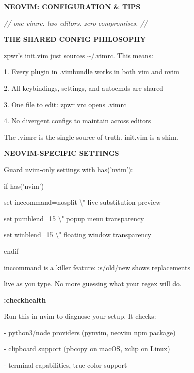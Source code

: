 \documentclass[11pt,a4paper,twoside]{book}
\begin{document}
\vspace{10pt}
{\large\bfseries\color{neoncyan} NEOVIM: CONFIGURATION \& TIPS}\vspace{6pt}

{\small\itshape\color{dimtext} // one vimrc. two editors. zero compromises. //}


\vspace{12pt}
{\bfseries\color{neonyellow} THE SHARED CONFIG PHILOSOPHY}\vspace{4pt}

zpwr's init.vim just sources \textasciitilde{}/.vimrc. This means:

1. Every plugin in .vimbundle works in both vim and nvim

2. All keybindings, settings, and autocmds are shared

3. One file to edit: zpwr vrc opens .vimrc

4. No divergent configs to maintain across editors

The .vimrc is the single source of truth. init.vim is a shim.


\vspace{12pt}
{\bfseries\color{neonyellow} NEOVIM-SPECIFIC SETTINGS}\vspace{4pt}

Guard nvim-only settings with has('nvim'):

if has('nvim')

set inccommand=nosplit   \textbackslash{}" live substitution preview

set pumblend=15          \textbackslash{}" popup menu transparency

set winblend=15          \textbackslash{}" floating window transparency

endif

inccommand is a killer feature: :s/old/new shows replacements

live as you type. No more guessing what your regex will do.


\vspace{12pt}
{\bfseries\color{neonyellow} :checkhealth}\vspace{4pt}

Run this in nvim to diagnose your setup. It checks:

- python3/node providers (pynvim, neovim npm package)

- clipboard support (pbcopy on macOS, xclip on Linux)

- terminal capabilities, true color support
\end{document}
